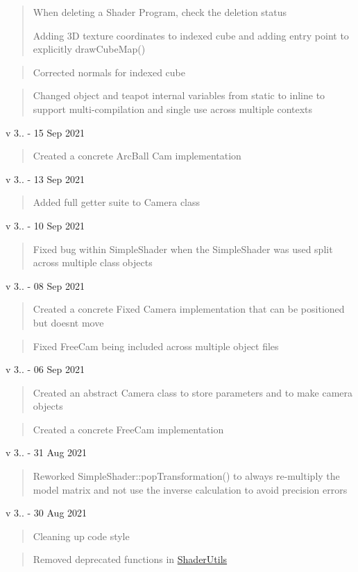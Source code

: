 \begin{quote}
When deleting a Shader Program, check the deletion status

Adding 3D texture coordinates to indexed cube and adding entry point to explicitly draw\+Cube\+Map() \end{quote}
\begin{quote}
Corrected normals for indexed cube ~\newline
 \end{quote}
\begin{quote}
Changed object and teapot internal variables from static to inline to support multi-\/compilation and single use across multiple contexts \end{quote}
v 3.. -\/ 15 Sep 2021 \begin{quote}
Created a concrete Arc\+Ball Cam implementation \end{quote}
v 3.. -\/ 13 Sep 2021 \begin{quote}
Added full getter suite to Camera class \end{quote}
v 3.. -\/ 10 Sep 2021 \begin{quote}
Fixed bug within Simple\+Shader when the Simple\+Shader was used split across multiple class objects \end{quote}
v 3.. -\/ 08 Sep 2021 \begin{quote}
Created a concrete Fixed Camera implementation that can be positioned but doesn\textquotesingle{}t move \end{quote}
\begin{quote}
Fixed Free\+Cam being included across multiple object files \end{quote}
v 3.. -\/ 06 Sep 2021 \begin{quote}
Created an abstract Camera class to store parameters and to make camera objects \end{quote}
\begin{quote}
Created a concrete Free\+Cam implementation \end{quote}
v 3.. -\/ 31 Aug 2021 \begin{quote}
Reworked Simple\+Shader\+::pop\+Transformation() to always re-\/multiply the model matrix and not use the inverse calculation to avoid precision errors \end{quote}
v 3.. -\/ 30 Aug 2021 \begin{quote}
Cleaning up code style \end{quote}
\begin{quote}
Removed deprecated functions in \mbox{\hyperlink{namespace_shader_utils}{Shader\+Utils}} \end{quote}

